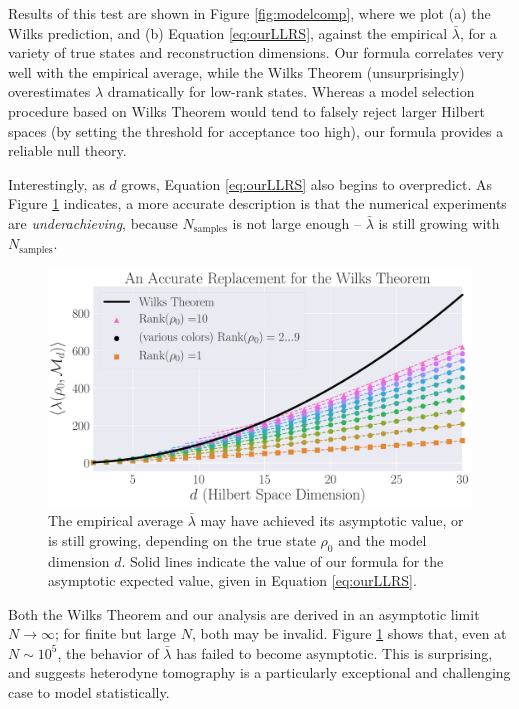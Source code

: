 \documentclass[aps,pra, twocolumn]{revtex4}
\begin{document}
Results of this test are shown in Figure \ref{fig:modelcomp}, where we plot (a) the Wilks prediction, and (b) Equation \eqref{eq:ourLLRS}, against the empirical $\bar\lambda$, for a variety of true states and reconstruction dimensions.  Our formula correlates very well with the empirical average, while the Wilks Theorem (unsurprisingly) overestimates $\lambda$ dramatically for low-rank states.  Whereas a model selection procedure based on Wilks Theorem would tend to falsely reject larger Hilbert spaces (by setting the threshold for acceptance too high), our formula provides a reliable null theory.

Interestingly, as $d$ grows, Equation \eqref{eq:ourLLRS} also begins to overpredict. As Figure \ref{fig:totalcontrib} indicates, a more accurate description is that the numerical experiments are \emph{underachieving}, because $N_{\mathrm{samples}}$ is not large enough -- $\bar\lambda$ is still growing with $N_{\mathrm{samples}}$. 

\begin{figure}[h]
  \includegraphics[width=\columnwidth]{Images/Figure_9.pdf}
 \caption{The empirical average $\bar{\lambda}$  may have achieved its asymptotic value, or is still 
growing, depending on the true state $\rho_{0}$ and the model dimension $d$. Solid lines indicate the value of our formula
for the asymptotic expected value, given in Equation \eqref{eq:ourLLRS}.}
\label{fig:totalcontrib}
\end{figure}


 Both the Wilks Theorem and our analysis are derived in an asymptotic limit $N \rightarrow \infty$; for finite but large $N$, both may be invalid.  Figure \ref{fig:totalcontrib} shows that, even at $N\sim 10^{5}$, the behavior of $\bar{\lambda}$ has failed to become asymptotic. This is surprising, and suggests heterodyne tomography is a particularly exceptional and challenging case to model statistically.
\end{document}
